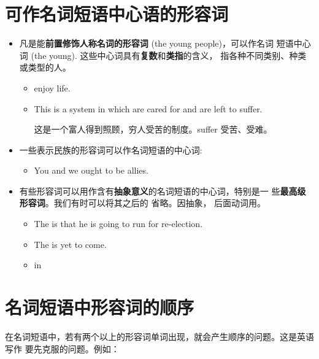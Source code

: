 \section{可作名词短语中心语的形容词}

\begin{itemize}
\item 凡是能\textbf{前置修饰人称名词的形容词} (the young people)，可以作名词
  短语中心词 (the young). 这些中心词具有\textbf{复数}和\textbf{类指}的含义，
  指各种不同类别、种类或类型的人。
  \begin{itemize}
  \item {} enjoy life.

  \item This is a system in which  are cared for and
     are left to suffer.

    这是一个富人得到照顾，穷人受苦的制度。suffer  受苦、受难。
  \end{itemize}
\item 一些表示民族的形容词可以作名词短语的中心词:
  \begin{itemize}
  \item You  and we  ought to be allies.
  \end{itemize}

\item 有些形容词可以用作含有\textbf{抽象意义}的名词短语的中心词，特别是一
  些\textbf{最高级形容词}。我们有时可以将其之后的  省略。因抽象，
  后面动词用。
  \begin{itemize}
  \item The  is that he is going to run for re-election.

  \item The  is yet to come.

  \item in 
  \end{itemize}

\end{itemize}

\section{名词短语中形容词的顺序}

在名词短语中，若有两个以上的形容词单词出现，就会产生顺序的问题。这是英语写作
要先克服的问题。例如：

